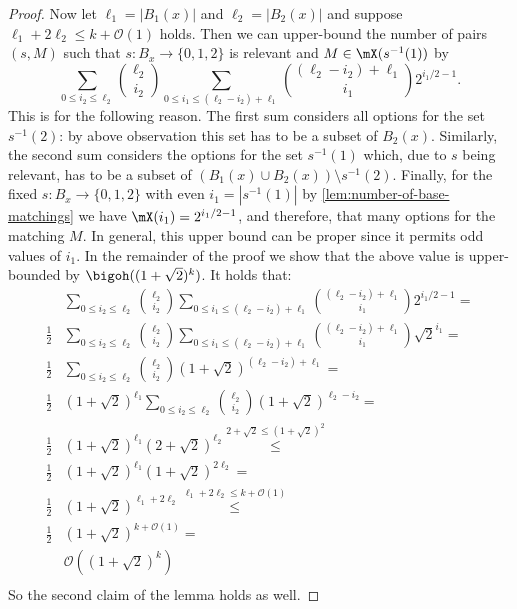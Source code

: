 \documentclass[a4paper,UKenglish,cleveref, autoref, thm-restate]{lipics-v2021}
\begin{document}
\begin{proof}
	Now let $\ell_1 = |B_1(x)|$ and $\ell_2 = |B_2(x)|$ and suppose $\ell_1 + 2\ell_2 \leq k + \mathcal{O}(1)$ holds.
	Then we can upper-bound the number of pairs $(s, M)$ such that $s \colon B_x \to \{0, 1, 2\}$ is relevant and $M \in \mX(s^{-1}(1))$ by
	\[
		\sum_{0 \leq i_2 \leq \ell_2} {\ell_2 \choose i_2} \sum_{0 \leq i_1 \leq (\ell_2 - i_2) + \ell_1} {(\ell_2 - i_2) + \ell_1 \choose i_1} 2^{i_1/2 - 1}.
	\]
	This is for the following reason.
	The first sum considers all options for the set $s^{-1}(2)$: by above observation this set has to be a subset of $B_2(x)$.
	Similarly, the second sum considers the options for the set $s^{-1}(1)$ which, due to $s$ being relevant, has to be a subset of $(B_1(x) \cup B_2(x)) \setminus s^{-1}(2)$.
	Finally, for the fixed $s \colon B_x \to \{0, 1, 2\}$ with even $i_1 = |s^{-1}(1)|$ by \cref{lem:number-of-base-matchings} we have $\mX(i_1) = 2^{i_1/2 - 1}$, and therefore, that many options for the matching $M$. 
	In general, this upper bound can be proper since it permits odd values of $i_1$.
	In the remainder of the proof we show that the above value is upper-bounded by $\bigoh((1+\sqrt{2})^k)$.
	It holds that:
	{\allowdisplaybreaks
	\begin{align*}
		&\sum_{0 \leq i_2 \leq \ell_2} {\ell_2 \choose i_2} \sum_{0 \leq i_1 \leq (\ell_2 - i_2) + \ell_1} {(\ell_2 - i_2) + \ell_1 \choose i_1} 2^{i_1/2 - 1} = \\
		\frac{1}{2} &\sum_{0 \leq i_2 \leq \ell_2} {\ell_2 \choose i_2} \sum_{0 \leq i_1 \leq (\ell_2 - i_2) + \ell_1} {(\ell_2 - i_2) + \ell_1 \choose i_1} \sqrt{2}^{i_1} = \\
		\frac{1}{2} &\sum_{0 \leq i_2 \leq \ell_2} {\ell_2  \choose i_2} (1+\sqrt 2)^{(\ell_2 - i_2) + \ell_1} = \\
		\frac{1}{2} &(1+\sqrt{2})^{\ell_1} \sum_{0 \leq i_2 \leq \ell_2} {\ell_2 \choose i_2} (1+\sqrt 2)^{\ell_2 - i_2} = \\
		\frac{1}{2} &(1+\sqrt{2})^{\ell_1} (2 + \sqrt{2})^{\ell_2} \stackrel{2 + \sqrt{2} \leq (1 + \sqrt 2)^2}{\leq} \\
		\frac{1}{2} &(1+\sqrt{2})^{\ell_1} (1 + \sqrt{2})^{2 \ell_2} = \\
		\frac{1}{2} &(1+\sqrt{2})^{\ell_1 + 2 \ell_2} \stackrel{\ell_1 + 2\ell_2 \leq k + \mathcal{O}(1)}{\leq} \\
		\frac{1}{2} &(1+\sqrt{2})^{k + \mathcal{O}(1)} = \\
		&\mathcal{O}((1+\sqrt{2})^k) \\
	\end{align*} 
	}
	So the second claim of the lemma holds as well.
\end{proof}
\end{document}
